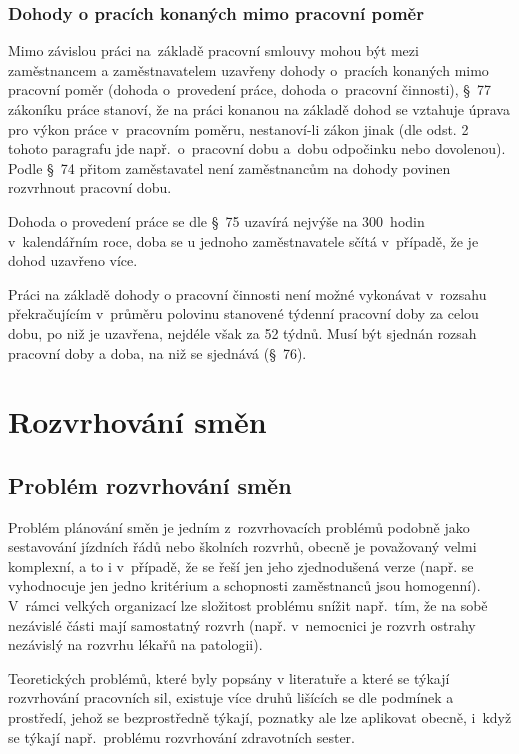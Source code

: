 \documentclass[twoside]{ctuthesis}
\begin{document}
\subsection{Dohody o pracích konaných mimo pracovní poměr}
Mimo závislou práci na~základě pracovní smlouvy mohou být mezi zaměstnancem a zaměstnavatelem uzavřeny dohody o~pracích konaných mimo pracovní poměr (dohoda o~provedení práce, dohoda o~pracovní činnosti), §~77 zákoníku práce stanoví, že na práci konanou na základě dohod se vztahuje úprava pro výkon práce v~pracovním poměru, nestanoví-li zákon jinak (dle odst. 2 tohoto paragrafu jde např.~o~pracovní dobu a~dobu odpočinku nebo dovolenou). Podle §~74 přitom zaměstavatel není zaměstnancům na dohody povinen rozvrhnout pracovní dobu.

Dohoda o provedení práce se dle §~75 uzavírá nejvýše na 300~hodin v~kalendářním roce, doba se u jednoho zaměstnavatele sčítá v~případě, že je dohod uzavřeno více.

Práci na základě dohody o pracovní činnosti není možné vykonávat v~rozsahu překračujícím v~průměru polovinu stanovené týdenní pracovní doby za celou dobu, po niž je uzavřena, nejdéle však za 52 týdnů. Musí být sjednán rozsah pracovní doby a doba, na niž se sjednává (§~76).

\chapter{Rozvrhování směn}
\section{Problém rozvrhování směn}

Problém plánování směn je jedním z~rozvrhovacích problémů podobně jako sestavování jízdních řádů nebo školních rozvrhů, obecně je považovaný velmi komplexní, a to i v~případě, že se řeší jen jeho zjednodušená verze (např. se vyhodnocuje jen jedno kritérium a schopnosti zaměstnanců jsou homogenní). V~rámci velkých organizací lze složitost problému snížit např.~tím, že na sobě nezávislé části mají samostatný rozvrh (např. v~nemocnici je rozvrh ostrahy nezávislý na rozvrhu lékařů na patologii).

Teoretických problémů, které byly popsány v literatuře a které se týkají rozvrhování pracovních sil, existuje více druhů lišících se dle podmínek a prostředí, jehož se bezprostředně týkají, poznatky ale lze aplikovat obecně, i~když se týkají např.~problému rozvrhování zdravotních sester.
\end{document}
